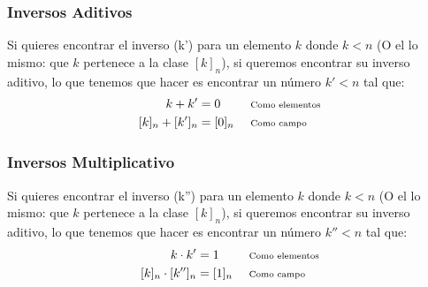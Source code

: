 \documentclass[12pt, fleqn]{report}                             %
\DeclareMathOperator \Space {\quad}                             %
\newcommand \Remember[1]{\Space\text{\scriptsize{#1}}}          %
\newenvironment{MultiLineEquation}[1]                           %
        {\begin{equation}\begin{alignedat}{#1}}                     %
        {\end{alignedat}\end{equation}}                             %
\begin{document}
            \subsubsection{Inversos Aditivos}

                Si quieres encontrar el inverso (k') para un elemento $k$ donde $k < n$
                (O el lo mismo: que $k$ pertenece a la clase $[k]_n$), si queremos encontrar
                su inverso aditivo, lo que tenemos que hacer es encontrar un número $k' < n$ tal que:
                \begin{MultiLineEquation}{3}
                    k + k'         &= 0         &&\Remember{Como elementos}    \\
                    [k]_n + [k']_n &= [0]_n     &&\Remember{Como campo}
                \end{MultiLineEquation}

            \subsubsection{Inversos Multiplicativo}

                Si quieres encontrar el inverso (k'') para un elemento $k$ donde $k < n$
                (O el lo mismo: que $k$ pertenece a la clase $[k]_n$), si queremos encontrar
                su inverso aditivo, lo que tenemos que hacer es encontrar un número $k'' < n$ tal que:
                \begin{MultiLineEquation}{3}
                    k \cdot k'          &= 1         &&\Remember{Como elementos}    \\
                    [k]_n \cdot [k'']_n &= [1]_n     &&\Remember{Como campo}
                \end{MultiLineEquation}







       
\end{document}

